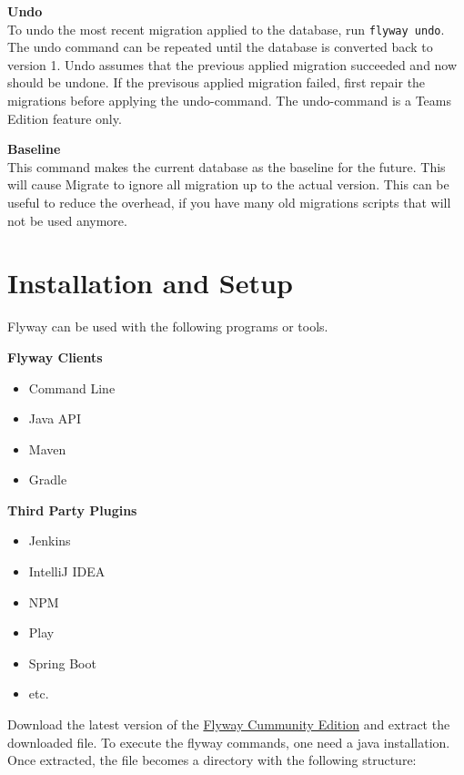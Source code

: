 \textbf{Undo}\\
To undo the most recent migration applied to the database, run \texttt{flyway undo}. The undo command can be repeated until the database is converted back to version 1.
Undo assumes that the previous applied migration succeeded and now should be undone. If the previsous applied migration failed, first repair the migrations before applying the undo-command. 
The undo-command is a Teams Edition feature only.

\textbf{Baseline}\\
This command makes the current database as the baseline for the future. This will cause Migrate to ignore all migration up to the actual version.
This can be useful to reduce the overhead, if you have many old migrations scripts that will not be used anymore.

\section{Installation and Setup}
%
Flyway can be used with the following programs or tools.

\begin{minipage}[t]{0.5\textwidth}
\textbf{Flyway Clients}

\begin{itemize}
	\item Command Line
	\item Java API
	\item Maven
	\item Gradle
\end{itemize}
\end{minipage}
\begin{minipage}[t]{0.5\textwidth}
	\textbf{Third Party Plugins}
	\begin{itemize}
		\item Jenkins
		\item IntelliJ IDEA
		\item NPM
		\item Play
		\item Spring Boot
		\item etc.
	\end{itemize}
\end{minipage}
\vspace{0.3cm}

%
Download the latest version of the \href{https://flywaydb.org/download/community}{Flyway Cummunity Edition} and extract the downloaded file. To execute the flyway commands, one need a java installation.
Once extracted, the file becomes a directory with the following structure:

